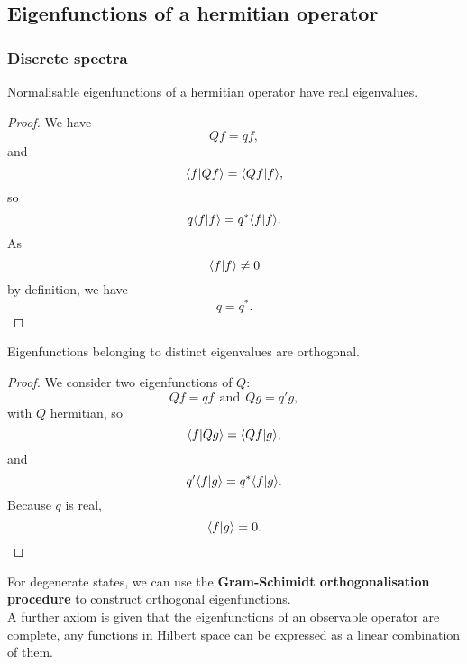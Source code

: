 \subsection{Eigenfunctions of a hermitian operator}
\subsubsection{Discrete spectra}
\begin{thrm}
Normalisable eigenfunctions of a hermitian operator have real eigenvalues.
\end{thrm}
\begin{proof}
We have
\begin{equation}
Qf=qf, 
\end{equation}
and
\begin{equation}
\langle f|Qf\rangle=\langle Qf|f\rangle,
\end{equation}
so
\begin{equation}
q \langle f|f\rangle=q^*\langle f|f\rangle.
\end{equation}
As 
\begin{equation}
\langle f|f\rangle\neq0
\end{equation}
by definition, we have
\begin{equation}
q=q^*.
\end{equation}
\end{proof}
\begin{thrm}[Orthogonality]
Eigenfunctions belonging to distinct eigenvalues are orthogonal. 
\end{thrm}
\begin{proof}
We consider two eigenfunctions of $Q$:
\begin{equation}
Qf=qf\ \ \text{and}\ \ Qg=q'g,
\end{equation}
with $Q$ hermitian, so
\begin{equation}
\langle f|Qg\rangle=\langle Qf|g\rangle,
\end{equation}
and 
\begin{equation}
q' \langle f|g\rangle=q^*\langle f|g\rangle.
\end{equation}
Because $q$ is real, 
\begin{equation}
\langle f|g\rangle=0.
\end{equation}
\end{proof}
For degenerate states, we can use the \textbf{Gram-Schimidt orthogonalisation procedure} to construct orthogonal eigenfunctions. \\
A further axiom is given that the eigenfunctions of an observable operator are complete, 
\ie any functions in Hilbert space can be expressed as a linear combination of them.
